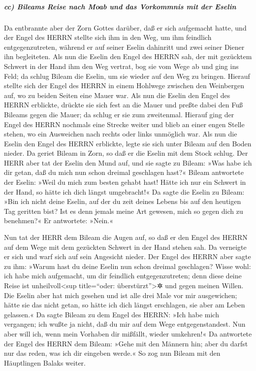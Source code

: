\hypertarget{cc-bileams-reise-nach-moab-und-das-vorkommnis-mit-der-eselin}{%
\subparagraph{cc) Bileams Reise nach Moab und das Vorkommnis mit der
Eselin}\label{cc-bileams-reise-nach-moab-und-das-vorkommnis-mit-der-eselin}}

Da entbrannte aber der Zorn Gottes darüber, daß er sich
aufgemacht hatte, und der Engel des HERRN stellte sich ihm in den Weg,
um ihm feindlich entgegenzutreten, während er auf seiner Eselin
dahinritt und zwei seiner Diener ihn begleiteten. Als nun
die Eselin den Engel des HERRN sah, der mit gezücktem Schwert in der
Hand ihm den Weg vertrat, bog sie vom Wege ab und ging ins Feld; da
schlug Bileam die Eselin, um sie wieder auf den Weg zu bringen.
Hierauf stellte sich der Engel des HERRN in einem
Hohlwege zwischen den Weinbergen auf, wo zu beiden Seiten eine Mauer
war. Als nun die Eselin den Engel des HERRN erblickte,
drückte sie sich fest an die Mauer und preßte dabei den Fuß Bileams
gegen die Mauer; da schlug er sie zum zweitenmal. Hierauf
ging der Engel des HERRN nochmals eine Strecke weiter und blieb an einer
engen Stelle stehen, wo ein Ausweichen nach rechts oder links unmöglich
war. Als nun die Eselin den Engel des HERRN erblickte,
legte sie sich unter Bileam auf den Boden nieder. Da geriet Bileam in
Zorn, so daß er die Eselin mit dem Stock schlug. Der HERR
aber tat der Eselin den Mund auf, und sie sagte zu Bileam: »Was habe ich
dir getan, daß du mich nun schon dreimal geschlagen hast?«
Bileam antwortete der Eselin: »Weil du mich zum besten
gehabt hast! Hätte ich nur ein Schwert in der Hand, so hätte ich dich
längst umgebracht!« Da sagte die Eselin zu Bileam: »Bin
ich nicht deine Eselin, auf der du zeit deines Lebens bis auf den
heutigen Tag geritten bist? Ist es denn jemals meine Art gewesen, mich
so gegen dich zu benehmen?« Er antwortete: »Nein.«

Nun tat der HERR dem Bileam die Augen auf, so daß er den
Engel des HERRN auf dem Wege mit dem gezückten Schwert in der Hand
stehen sah. Da verneigte er sich und warf sich auf sein Angesicht
nieder. Der Engel des HERRN aber sagte zu ihm: »Warum
hast du deine Eselin nun schon dreimal geschlagen? Wisse wohl: ich habe
mich aufgemacht, um dir feindlich entgegenzutreten; denn diese deine
Reise ist unheilvoll\textless sup title=``oder:
überstürzt''\textgreater✲ und gegen meinen Willen. Die
Eselin aber hat mich gesehen und ist alle drei Male vor mir ausgewichen;
hätte sie das nicht getan, so hätte ich dich längst erschlagen, sie aber
am Leben gelassen.« Da sagte Bileam zu dem Engel des
HERRN: »Ich habe mich vergangen; ich wußte ja nicht, daß du mir auf dem
Wege entgegenstandest. Nun aber will ich, wenn mein Vorhaben dir
mißfällt, wieder umkehren!« Da antwortete der Engel des
HERRN dem Bileam: »Gehe mit den Männern hin; aber du darfst nur das
reden, was ich dir eingeben werde.« So zog nun Bileam mit den
Häuptlingen Balaks weiter.

